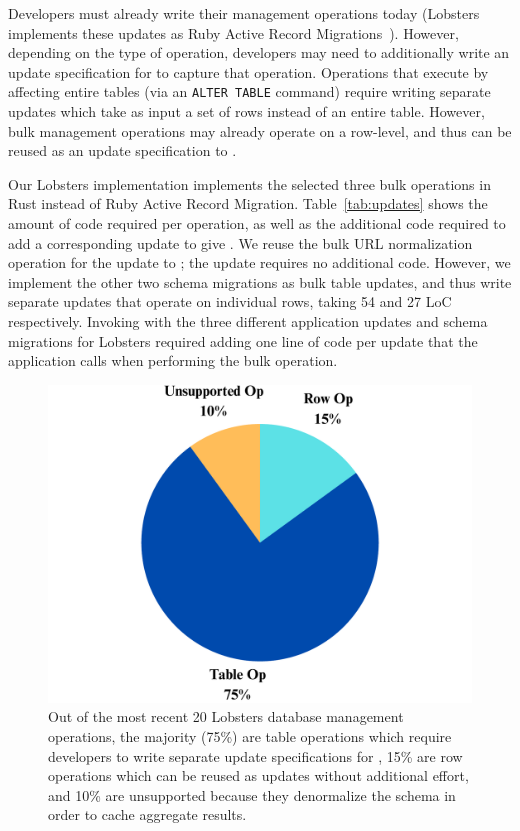 Developers must already write their management operations today (\eg Lobsters
implements these updates as Ruby Active Record Migrations~\cite{ruby_arm}). 
%
However, depending on the type of operation, developers may need to additionally
write an update specification for \sys to capture that operation.
%
Operations that execute by affecting entire tables (\eg via an \texttt{ALTER
TABLE} command) require writing separate updates which take as input a set of
rows instead of an entire table.
%
However, bulk management operations may already operate on a row-level, and thus
can be reused as an update specification to \sys.


%
Our Lobsters implementation implements the selected three bulk operations in
Rust instead of Ruby Active Record Migration. Table~\ref{tab:updates} shows the
amount of code required per operation, as well as the additional code required
to add a corresponding update to give \sys. We reuse the bulk URL normalization
operation for the update to \sys; the update requires no additional code.
However, we implement the other two schema migrations as bulk table updates,
and thus write separate updates that operate on individual rows, taking 54 and
27 LoC respectively.
%
%
Invoking \sys with the three different application updates and schema migrations
for Lobsters required adding one line of code per update that the application
calls when performing the bulk operation. 
%

\begin{figure}
\centering
  \includegraphics[width=.7\columnwidth]{figs/categories}

    \caption{Out of the most recent 20 Lobsters database management operations,
    the majority (75\%) are table operations which require developers to write
    separate update specifications for \sys, 15\% are row operations which can
    be reused as updates without additional effort, and 10\% are unsupported
    because they denormalize the schema in order to cache aggregate results.}
  \label{tab:categories}
\end{figure}

